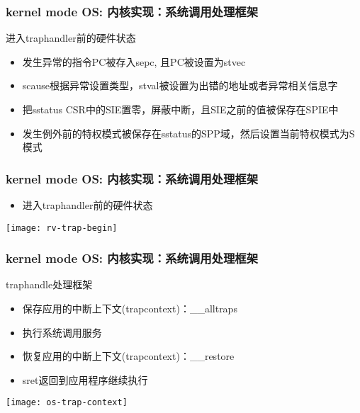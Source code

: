 \begin{frame}
    \frametitle{kernel mode OS: 内核实现：系统调用处理框架}
    进入trap\-handler前的硬件状态
    \begin{itemize}
        
    \item 发生异常的指令PC被存入sepc, 且PC被设置为stvec
    \item scause根据异常设置类型，stval被设置为出错的地址或者异常相关信息字
    \item 把sstatus CSR中的SIE置零，屏蔽中断，且SIE之前的值被保存在SPIE中
    \item 发生例外前的特权模式被保存在sstatus的SPP域，然后设置当前特权模式为S模式
        
    \end{itemize}	
\end{frame}

\begin{frame}
    \frametitle{kernel mode OS: 内核实现：系统调用处理框架}
    
    \begin{itemize}
        
        \item 进入trap\-handler前的硬件状态
        
        
    \end{itemize}	
    \centering
    \texttt{[image: rv-trap-begin]}
\end{frame}

\begin{frame}
    \frametitle{kernel mode OS: 内核实现：系统调用处理框架}
    trap\-handle处理框架
    \begin{itemize}
        
        \item 保存应用的中断上下文(trap\-context)：\_\_alltraps
        \item 执行系统调用服务
        \item 恢复应用的中断上下文(trap\-context)：\_\_restore
        \item sret返回到应用程序继续执行
    \end{itemize}	
    \centering
    \texttt{[image: os-trap-context]}
\end{frame}

